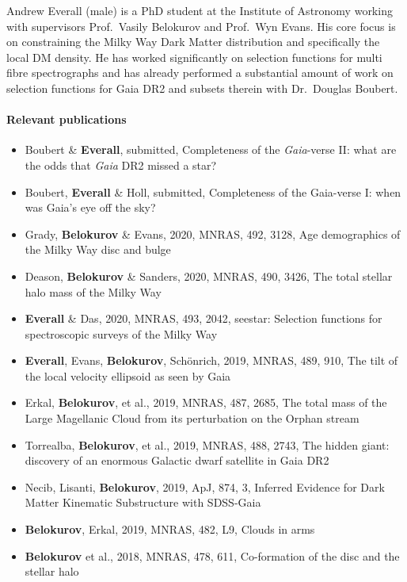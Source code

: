 Andrew Everall (male) is a PhD student at the Institute of Astronomy working with supervisors Prof.~Vasily Belokurov and Prof.~Wyn Evans. His core focus is on constraining the Milky Way Dark Matter distribution and specifically the local DM density. He has worked significantly on selection functions for multi fibre spectrographs and has already performed a substantial amount of work on selection functions for Gaia DR2 and subsets therein with Dr.~Douglas Boubert. 

\paragraph{Relevant publications}

\begin{itemize}
    \item Boubert \& \textbf{Everall}, submitted, Completeness of the \textit{Gaia}-verse II: what are the odds that \textit{Gaia} DR2 missed a star?
    \item Boubert, \textbf{Everall} \& Holl, submitted, Completeness of the Gaia-verse I: when was Gaia’s eye off the sky?
    \item Grady, \textbf{Belokurov} \& Evans, 2020, MNRAS, 492, 3128, Age demographics of the Milky Way disc and bulge
    \item Deason, \textbf{Belokurov} \& Sanders, 2020, MNRAS, 490, 3426, The total stellar halo mass of the Milky Way
    \item \textbf{Everall} \& Das, 2020, MNRAS, 493, 2042, seestar: Selection functions for spectroscopic surveys of the Milky Way
    \item \textbf{Everall}, Evans, \textbf{Belokurov}, Schönrich, 2019, MNRAS, 489, 910, The tilt of the local velocity ellipsoid as seen by Gaia
    \item Erkal, \textbf{Belokurov}, et al., 2019, MNRAS, 487, 2685, The total mass of the Large Magellanic Cloud from its perturbation on the Orphan stream
    \item Torrealba, \textbf{Belokurov}, et al., 2019, MNRAS, 488, 2743, The hidden giant: discovery of an enormous Galactic dwarf satellite in Gaia DR2
    \item Necib, Lisanti, \textbf{Belokurov}, 2019, ApJ, 874, 3, Inferred Evidence for Dark Matter Kinematic Substructure with SDSS-Gaia
    \item \textbf{Belokurov}, Erkal, 2019, MNRAS, 482, L9, Clouds in arms
    \item \textbf{Belokurov} et al., 2018, MNRAS, 478, 611, Co-formation of the disc and the stellar halo
\end{itemize}

